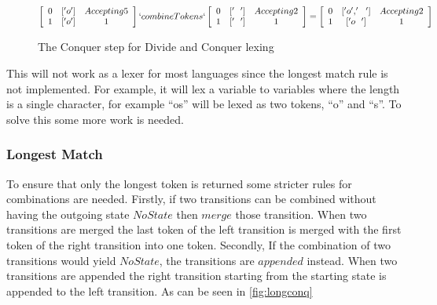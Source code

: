 \begin{figure}[!ht]
\begin{center}
$\left[\begin{array}{ccc}
0&['o']&Accepting 5\\
1&['o']&1\\
\end{array}\right] `combineTokens`
\left[\begin{array}{ccc}
0&['~~']&Accepting 2\\
1&['~~']&1\\
\end{array}\right] =
\left[\begin{array}{ccc}
0&['o','~~']&Accepting 2\\
1&['o~~']&1\\
\end{array}\right]$
\caption{The Conquer step for Divide and Conquer lexing\label{fig:conq}}
\end{center}
\end{figure}

This will not work as a lexer for most languages since the longest match rule is
not implemented. For example, it will lex a variable to variables where the
length is a single character, for example ``os'' will be lexed as two tokens,
``o'' and ``s''. To solve this some more work is needed.

\subsubsection{Longest Match}\label{longmatch}
To ensure that only the longest token is returned some stricter rules for
combinations are needed. Firstly, if two transitions can be combined without
having the outgoing state $NoState$ then $merge$ those transition. When two
transitions are merged the last token of the left transition is merged with
the first token of the right transition into one token. Secondly, If the
combination of two transitions would yield $NoState$, the transitions are
$appended$ instead. When two transitions are appended the right transition
starting from the starting state is appended to the left transition. As can be
seen in \cref{fig:longconq} 

